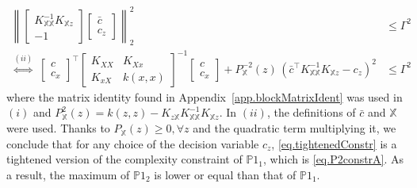 \begin{my_proof}
\begin{subequations}
\begin{align}
			\left\|
			\begin{bmatrix}
				K_{\mathds{X} \mathds{X} }^{-1} K_{\mathds{X} z} \\
				-1
			\end{bmatrix}
			\begin{bmatrix}
				\bar c \\
				c_z
			\end{bmatrix}\right\|_2^2
			& \leq \Gamma^2 \\
			\overset{(ii)}{\Leftrightarrow} \;
			\begin{bmatrix}
				c \\
				c_x
			\end{bmatrix}^\top 
			\begin{bmatrix}
				K_{XX} & K_{Xx} \\
				K_{xX} & k(x,x)
			\end{bmatrix}^{-1} 
			\begin{bmatrix}
				c \\
				c_x
			\end{bmatrix} \label{eq.tightenedConstr}%
			+
			P_{\mathds{X} }^{-2}(z) \, \left( \bar c^\top K_{\mathds{X} \mathds{X} }^{-1} K_{\mathds{X} z} - c_z \right)^2 
			&\leq \Gamma^2 
		\end{align}
		\label{eq.quadraticDecomp}
	\end{subequations}
	where the matrix identity found in Appendix~\ref{app.blockMatrixIdent} was used in $(i)$ and $P^2_{\mathds{X} }(z) = k(z,z) - K_{z \mathds{X} } K_{\mathds{X} \mathds{X} }^{-1} K_{\mathds{X} z}$. In $(ii)$, the definitions of $\bar c$ and $\mathds{X} $ were used. Thanks to $P_{\mathds{X} }(z) \geq 0, \forall z$ and the quadratic term multiplying it, we conclude that for any choice of the decision variable $c_z$, \eqref{eq.tightenedConstr} is a tightened version of the complexity constraint of $\mathds{P}1_1$, which is \eqref{eq.P2constrA}. As a result, the maximum of $\mathds{P}1_2$ is lower or equal than that of $\mathds{P}1_1$. 
\end{my_proof}

